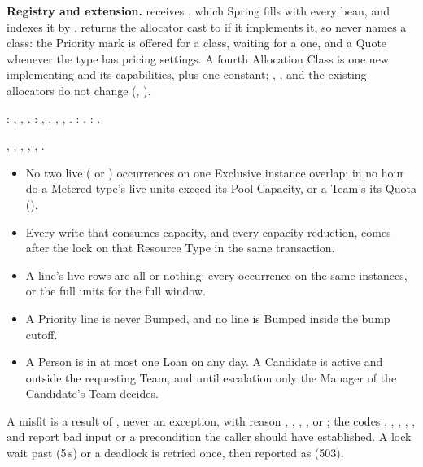 \textbf{Registry and extension.}  receives , which Spring fills with every  bean, and indexes it by .  returns the allocator cast to  if it implements it, so  never names a class: the Priority mark is offered for a  class, waiting for a  one, and a Quote whenever the type has pricing settings. A fourth Allocation Class is one new  implementing  and its capabilities, plus one  constant; , , and the existing allocators do not change (, ).

: , , . : , , , , . : . : .

, , , , , .

\begin{itemize}
\item No two live ( or ) occurrences on one Exclusive instance overlap; in no hour do a Metered type's live units exceed its Pool Capacity, or a Team's its Quota ().
\item Every write that consumes capacity, and every capacity reduction, comes after the lock on that Resource Type in the same transaction.
\item A line's live rows are all or nothing: every occurrence on the same instances, or the full units for the full window.
\item A Priority line is never Bumped, and no line is Bumped inside the bump cutoff.
\item A Person is in at most one Loan on any day. A Candidate is active and outside the requesting Team, and until escalation only the Manager of the Candidate's Team decides.
\end{itemize}

{\sloppy A misfit is a result of , never an exception, with reason , , , , or ; the codes , , , , , and  report bad input or a precondition the caller should have established. A lock wait past  (5\,s) or a deadlock is retried once, then reported as  (503).\par}

